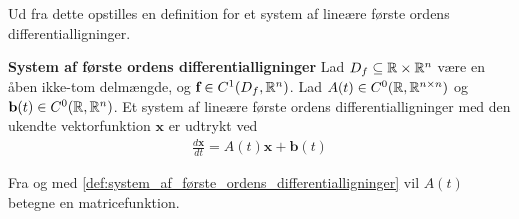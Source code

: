 Ud fra dette opstilles en definition for et system af lineære første ordens differentialligninger.
%
\begin{minipage}\textwidth
\begin{defn}\label{def:system_af_første_ordens_differentialligninger}\textbf{System af første ordens differentialligninger} %
\newline
Lad $D_f \subseteq \mathbb{R} \times \mathbb{R}^n$ være en åben ikke-tom delmængde, og $\textbf{f}\in C^1(D_f, \mathbb{R}^n)$. Lad $A(t) \in C^0(\mathbb{R}, \mathbb{R}^{n \times n})$ og $\textbf{b}(t) \in C^0(\mathbb{R}, \mathbb{R}^n)$. Et system af lineære første ordens differentialligninger med den ukendte vektorfunktion $\textbf{x}$ er udtrykt ved
\begin{align}
    \frac{d\textbf{x}}{dt} = A(t)\textbf{x} + \textbf{b}(t)
\end{align}
\end{defn}
\end{minipage}

Fra og med \autoref{def:system_af_første_ordens_differentialligninger} vil $A(t)$ betegne en matricefunktion. 
